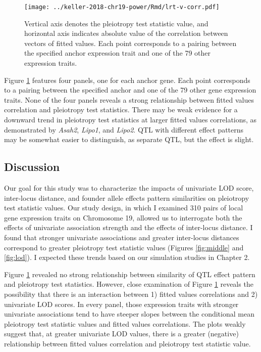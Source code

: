 \documentclass[oneside]{book}\usepackage[]{graphicx}\usepackage[]{color}
\begin{document}

\begin{figure}
    \centering
    \texttt{[image: ../keller-2018-chr19-power/Rmd/lrt-v-corr.pdf]}
    \caption[Pleiotropy LRT vs. fitted values correlations plots reveal little evidence for a relationship.]{Vertical axis denotes the pleiotropy test statistic value, and horizontal axis indicates absolute value of the correlation between vectors of fitted values. Each point corresponds to a pairing between the specified anchor expression trait and one of the 79 other expression traits.}
    \label{fig:cor}
\end{figure}

Figure \ref{fig:cor} features four panels, one for each anchor gene. 
Each point corresponds to a pairing between the specified anchor and one of the 79 other gene expression traits. 
None of the four panels reveals a strong relationship between fitted values correlation and pleiotropy test statistics. 
There may be weak evidence for a downward trend in pleiotropy
test statistics at larger fitted values correlations, as 
demonstrated by \emph{Asah2}, \emph{Lipo1}, and \emph{Lipo2}. QTL with different effect patterns may be somewhat easier to distinguish, as separate QTL, but the effect is slight.



\subsection{Discussion}

Our goal for this study was to characterize the impacts of univariate LOD score, 
inter-locus distance, and founder allele effects pattern similarities on pleiotropy test
statistic values. 
Our study design, in which I examined 310 pairs of local gene expression traits on Chromosome
19, allowed us to interrogate both the effects of univariate association strength and the
effects of inter-locus distance. 
I found that stronger univariate associations and greater inter-locus distances
correspond to greater pleiotropy test statistic values (Figures \ref{fig:middle} 
and \ref{fig:lod}). 
I expected these trends based on our simulation studies in Chapter 2.

Figure \ref{fig:cor} revealed no strong relationship between similarity of QTL effect pattern and pleiotropy test statistics. 
However, close examination of Figure \ref{fig:cor} reveals the possibility that there is an interaction between 1) fitted values correlations and 2) univariate LOD scores. 
In every panel, those expression traits with stronger univariate associations
tend to have steeper slopes between the conditional mean pleiotropy
test statistic values and fitted values correlations. 
The plots weakly suggest that, at greater univariate LOD values, 
there is a greater (negative) relationship between fitted values 
correlation and pleiotropy test statistic value.
\end{document}
